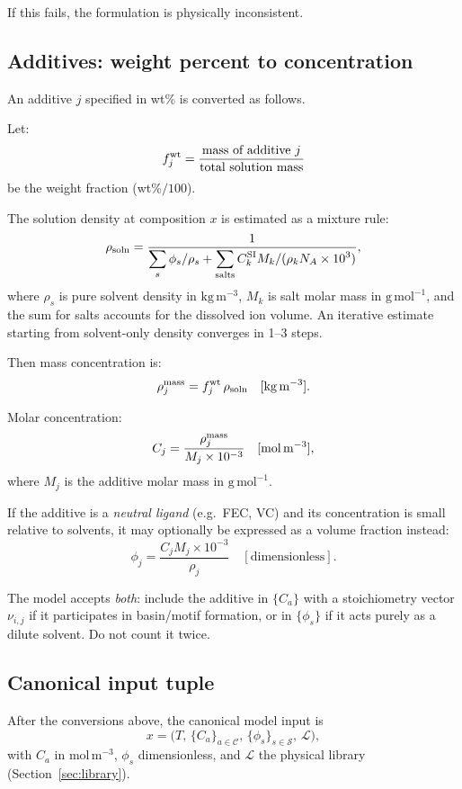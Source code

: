 \documentclass[11pt]{article}
\begin{document}
If this fails, the formulation is physically inconsistent.

\subsection{Additives: weight percent to concentration}

An additive \(j\) specified in wt\% is converted as follows.

Let:
\[
f_j^{\rm wt} = \frac{\text{mass of additive }j}{\text{total solution mass}}
\]
be the weight fraction (wt\%$/100$).

The solution density at composition \(x\) is estimated as a mixture rule:
\[
\rho_{\rm soln}
=
\frac{1}
{\displaystyle
\sum_s \phi_s/\rho_s
+
\sum_{\rm salts} C_k^{\rm SI} M_k / (\rho_k N_A \times 10^3)
},
\]
where \(\rho_s\) is pure solvent density in \(\mathrm{kg\,m^{-3}}\), \(M_k\)
is salt molar mass in \(\mathrm{g\,mol^{-1}}\), and the sum for salts accounts
for the dissolved ion volume. An iterative estimate starting from solvent-only
density converges in 1--3 steps.

Then mass concentration is:
\[
\rho_j^{\rm mass}
=
f_j^{\rm wt}\,\rho_{\rm soln}
\quad [\mathrm{kg\,m^{-3}}].
\]

Molar concentration:
\[
C_j
=
\frac{\rho_j^{\rm mass}}{M_j\times 10^{-3}}
\quad [\mathrm{mol\,m^{-3}}],
\]
where \(M_j\) is the additive molar mass in \(\mathrm{g\,mol^{-1}}\).

If the additive is a \emph{neutral ligand} (e.g.\ FEC, VC) and its
concentration is small relative to solvents, it may optionally be expressed as
a volume fraction instead:
\[
\phi_j
=
\frac{C_j M_j \times 10^{-3}}{\rho_j}
\quad [\text{dimensionless}].
\]

The model accepts \emph{both}: include the additive in \(\{C_a\}\) with a
stoichiometry vector \(\nu_{i,j}\) if it participates in basin/motif formation,
or in \(\{\phi_s\}\) if it acts purely as a dilute solvent. Do not count it
twice.

\subsection{Canonical input tuple}

After the conversions above, the canonical model input is
\[
x
=
\bigl(
T,\,
\{C_a\}_{a\in\mathcal C},\,
\{\phi_s\}_{s\in\mathcal S},\,
\mathcal L
\bigr),
\]
with \(C_a\) in \(\mathrm{mol\,m^{-3}}\), \(\phi_s\) dimensionless, and
\(\mathcal L\) the physical library (Section~\ref{sec:library}).
\end{document}
